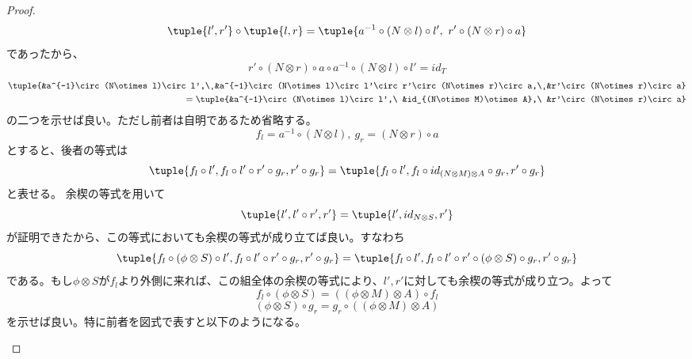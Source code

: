 \documentclass[uplatex,dvipdfmx]{jsarticle}
\begin{document}
  \begin{proof}
    \[\tuple{l',r'}\circ\tuple{l,r}=\tuple{a^{-1}\circ(N\otimes l)\circ l',\ r'\circ(N\otimes r)\circ a}\]であったから、
    \[r'\circ(N\otimes r)\circ a\circ a^{-1}\circ(N\otimes l)\circ l'=id_T\]
    \begin{alignat*}{2}
      \tuple{&a^{-1}\circ(N\otimes l)\circ l',\ &a^{-1}\circ(N\otimes l)\circ l'\circ r'\circ(N\otimes r)\circ a,\ &r'\circ(N\otimes r)\circ a}\\
      =\tuple{&a^{-1}\circ(N\otimes l)\circ l',\ &id_{(N\otimes M)\otimes A},\ &r'\circ(N\otimes r)\circ a}
    \end{alignat*}
    の二つを示せば良い。ただし前者は自明であるため省略する。
    \[f_l = a^{-1}\circ(N\otimes l), \ g_r = (N\otimes r)\circ a\]とすると、後者の等式は\[\tuple{f_l\circ l',f_l\circ l'\circ r'\circ g_r, r'\circ g_r}=\tuple{f_l\circ l',f_l\circ id_{(N\otimes M)\otimes A}\circ g_r, r'\circ g_r}\]と表せる。
    余楔の等式を用いて\[\tuple{l',l'\circ r', r'} = \tuple{l', id_{N\otimes S}, r'}\]が証明できたから、この等式においても余楔の等式が成り立てば良い。すなわち\[\tuple{f_l\circ(\phi\otimes S) \circ l',f_l\circ l'\circ r'\circ g_r, r'\circ g_r} = \tuple{f_l\circ l',f_l \circ l'\circ r'\circ(\phi\otimes S)\circ g_r, r'\circ g_r}\]である。もし$\phi\otimes S$が$f_l$より外側に来れば、この組全体の余楔の等式により、$l',r'$に対しても余楔の等式が成り立つ。よって\[f_l\circ(\phi\otimes S) = ((\phi\otimes M)\otimes A)\circ f_l\]\[(\phi\otimes S)\circ g_r = g_r\circ((\phi\otimes M)\otimes A)\]を示せば良い。特に前者を図式で表すと以下のようになる。

    \begin{center}
\end{center}
\end{proof}
\end{document}
